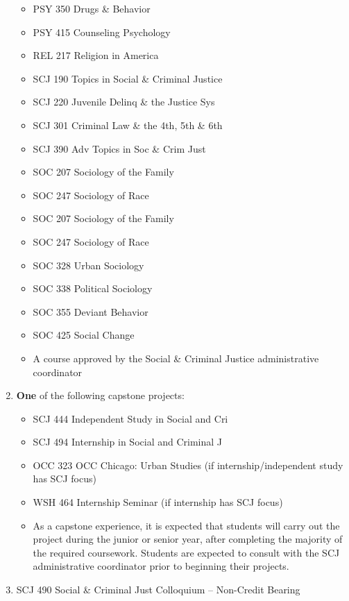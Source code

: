 \documentclass[
  letterpaper,
]{scrbook}
\providecommand{\tightlist}{%
  \setlength{\itemsep}{0pt}\setlength{\parskip}{0pt}}
\begin{document}
\begin{enumerate}
\begin{itemize}
  \item
    PSY 350 Drugs \& Behavior
  \item
    PSY 415 Counseling Psychology
  \item
    REL 217 Religion in America
  \item
    SCJ 190 Topics in Social \& Criminal Justice
  \item
    SCJ 220 Juvenile Delinq \& the Justice Sys
  \item
    SCJ 301 Criminal Law \& the 4th, 5th \& 6th
  \item
    SCJ 390 Adv Topics in Soc \& Crim Just
  \item
    SOC 207 Sociology of the Family
  \item
    SOC 247 Sociology of Race
  \item
    SOC 207 Sociology of the Family
  \item
    SOC 247 Sociology of Race
  \item
    SOC 328 Urban Sociology
  \item
    SOC 338 Political Sociology
  \item
    SOC 355 Deviant Behavior
  \item
    SOC 425 Social Change
  \item
    A course approved by the Social \& Criminal Justice administrative
    coordinator
  \end{itemize}
\item
  \textbf{One} of the following capstone projects:

  \begin{itemize}
  \tightlist
  \item
    SCJ 444 Independent Study in Social and Cri
  \item
    SCJ 494 Internship in Social and Criminal J
  \item
    OCC 323 OCC Chicago: Urban Studies (if internship/independent study
    has SCJ focus)
  \item
    WSH 464 Internship Seminar (if internship has SCJ focus)
  \item
    As a capstone experience, it is expected that students will carry
    out the project during the junior or senior year, after completing
    the majority of the required coursework. Students are expected to
    consult with the SCJ administrative coordinator prior to beginning
    their projects.
  \end{itemize}
\item
  SCJ 490 Social \& Criminal Just Colloquium -- Non-Credit Bearing
\end{enumerate}
\end{document}

